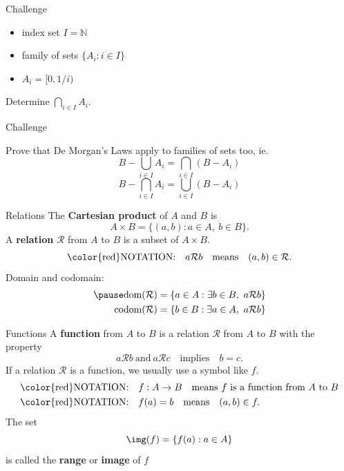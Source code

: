 \documentclass{beamer}
\begin{document}
\begin{frame}{Challenge}
\begin{itemize}
\item index set $I = \mathbb N$
\item family of sets $\{A_i: i\in I\}$
\item $A_i = [0,1/i)$
\end{itemize}
\begin{prob}
Determine $\bigcap_{i\in I} A_i$.
\end{prob}
\end{frame}

\begin{frame}{Challenge}
\begin{prob}
Prove that De Morgan's Laws apply to families of sets too, ie.
$$B-\bigcup_{i\in I} A_i = \bigcap_{i\in I} (B-A_i)$$
\pause
$$B-\bigcap_{i\in I} A_i = \bigcup_{i\in I} (B-A_i)$$
\end{prob}
\end{frame}

\begin{frame}{Relations}
The \textbf{Cartesian product} of $A$ and $B$ is
$$A\times B = \{(a,b): a\in A,\ b\in B\}.$$
\pause
A \textbf{relation} $\mathcal R$ from $A$ to $B$ is a subset of $A\times B$.\\
\pause
$$\text{\color{red}NOTATION:}\quad a\mathcal R b\quad\text{means}\quad (a,b)\in \mathcal R.$$
\pause
Domain and codomain:
\pause
\begin{align*}
\pause
\text{dom}(\mathcal{R}) &= \{a\in A: \exists b\in B,\ a\mathcal R b\}\\
\text{codom}(\mathcal{R}) &= \{b\in B: \exists a\in A,\ a\mathcal R b\}
\end{align*}
\end{frame}

\begin{frame}{Functions}
A \textbf{function} from $A$ to $B$ is a relation $\mathcal R$ from $A$ to $B$ with the property
\pause
$$a\mathcal Rb\ \text{and}\ a\mathcal Rc\quad\text{implies}\quad b=c.$$
\pause
If a relation $\mathcal R$ is a function, we usually use a symbol like $f$.\\
\pause
\begin{align*}
\text{\color{red}NOTATION:}&\quad f: A\rightarrow B\quad\text{means $f$ is a function from $A$ to $B$}\\
\text{\color{red}NOTATION:}&\quad f(a) = b\quad\text{means}\quad (a,b)\in f.
\end{align*}
\pause
The set $$\img(f) = \{f(a): a\in A\}$$ is called the \textbf{range} or \textbf{image} of $f$
\end{frame}
\end{document}
